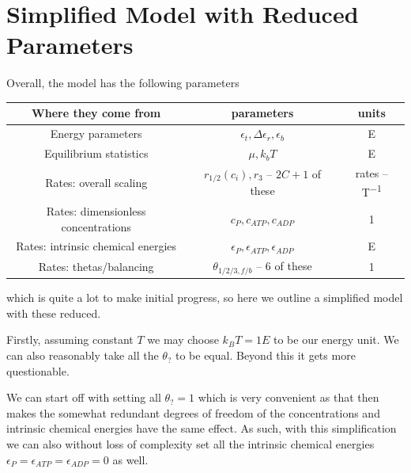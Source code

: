 \documentclass[11pt]{article}
\begin{document}
\section{Simplified Model with Reduced Parameters}\label{sec:simpar}
Overall, the model has the following parameters
\begin{table}[H]
	\centering
	\begin{tabular}{c|c|c}
		Where they come from                & parameters                                 & units                \\
		\hline
		Energy parameters                   & $\epsilon_t, \Delta\epsilon_r, \epsilon_b$ & \si{E}               \\
		Equilibrium statistics              & $\mu, \si{k_b}T$                           & \si{E}               \\
		Rates: overall scaling              & $r_{1/2}(c_i),r_3$ -- $2C+1$ of these      & rates -- \si{T^{-1}} \\
		Rates: dimensionless concentrations & $c_P,c_{ATP},c_{ADP}$                      & \si{1}               \\
		Rates: intrinsic chemical energies  & $\epsilon_P,\epsilon_{ATP},\epsilon_{ADP}$ & \si{E}               \\
		Rates: thetas/balancing             & $\theta_{1/2/3,f/b}$ -- 6 of these         & \si{1}               \\
	\end{tabular}
\end{table}
which is quite a lot to make initial progress, so here we outline a simplified model with these reduced.

Firstly, assuming constant $T$ we may choose $\si{k_B}T = 1\si{E}$ to be our energy unit.
We can also reasonably take all the $\theta_?$ to be equal.
Beyond this it gets more questionable.

\begin{tcolorbox}
	We can start off with setting all $\theta_? = 1$ which is very convenient as that then makes the somewhat redundant degrees of freedom of the concentrations and intrinsic chemical energies have the same effect.
	As such, with this simplification we can also without loss of complexity set all the intrinsic chemical energies $\epsilon_P=\epsilon_{ATP}=\epsilon_{ADP}=0$ as well.
\end{tcolorbox}
\end{document}
